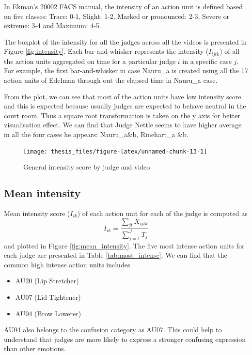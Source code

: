\documentclass{monashthesis}
\begin{document}
In Ekman's 20002 FACS manual, the intensity of an action unit is defined based on five classes: Trace: 0-1, Slight: 1-2, Marked or pronounced: 2-3, Severe or extreme: 3-4 and Maximum: 4-5.

The boxplot of the intensity for all the judges across all the videos is presented in Figure \ref{fig:intensity}. Each bar-and-whisker represents the intensity (\(I_{ijtk}\)) of all the action units aggregated on time for a particular judge \(i\) in a specific case \(j\). For example, the first bar-and-whisker in case Nauru\_a is created using all the 17 action units of Edelman through out the elapsed time in Nauru\_a case.

From the plot, we can see that most of the action units have low intensity score and this is expected because usually judges are expected to behave neutral in the court room. Thus a square root transformation is taken on the y axis for better visualisation effect. We can find that Judge Nettle seems to have higher average in all the four cases he appears: Nauru\_a\&b, Rinehart\_a \&b.

\begin{figure}
\texttt{[image: thesis\_files/figure-latex/unnamed-chunk-13-1]} \caption{General intensity score by judge and video\label{fig:intensity}}\label{fig:unnamed-chunk-13}
\end{figure}

\hypertarget{mean-intensity}{%
\subsection{Mean intensity}\label{mean-intensity}}

Mean intensity score (\(I_{ik}\)) of each action unit for each of the judge is computed as \[I_{ik} = \frac{\sum_{jt}X_{ijtk}}{\sum_{j = 1}^JT_j}\] and plotted in Figure \ref{fig:mean_intensity}. The five most intense action units for each judge are presented in Table \ref{tab:most_intense}. We can find that the common high intense action units includes

\begin{itemize}
\tightlist
\item
  AU20 (Lip Stretcher)
\item
  AU07 (Lid Tightener)
\item
  AU04 (Brow Lowerer)
\end{itemize}

AU04 also belongs to the confusion category as AU07. This could help to understand that judges are more likely to express a stronger confusing expression than other emotions.
\end{document}
